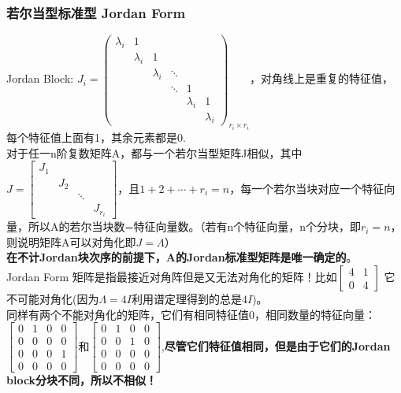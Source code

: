 \documentclass[UTF8]{article}
\begin{document}
    \subsubsection{若尔当型标准型 Jordan Form}
    Jordan Block: $J_{i}=\left(\begin{array}{cccccc}{\lambda_{i}} & {1} & {} & {} & {} \\ {} & {\lambda_{i}} & {1} & {} & {} &{} \\ {} & {} & {\lambda_{i}} & {\ddots} & {}&{} \\ {} & {} & {} & {\ddots} & {1}&{} \\ {} & {} & {} &{} & {\lambda_{i}} & {1} \\ {}&{} & {} & {} & {} & {\lambda_{i}}\end{array}\right)_{r_{i}\times r_{i}}$，对角线上是重复的特征值，每个特征值上面有1，其余元素都是0.
    \\
    对于任一n阶复数矩阵A，都与一个若尔当型矩阵J相似，其中$J=\left[\begin{array}{cccc} J_{1} & & & \\ &J_{2} & & \\ & &  \ddots &\\  & & & J_{r_{i}}
    \end{array}\right]$，且$1+2+\cdots +r_{i}=n$，每一个若尔当块对应一个特征向量，所以A的若尔当块数=特征向量数。（若有n个特征向量，n个分块，即$r_{i}=n$，则说明矩阵A可以对角化即$J=\Lambda$）
    \\
    \textbf{在不计Jordan块次序的前提下，A的Jordan标准型矩阵是唯一确定的}。
    \\
    Jordan Form 矩阵是指最接近对角阵但是又无法对角化的矩阵！比如$\begin{bmatrix}4 & 1 \\ 0 & 4\end{bmatrix}$ 它不可能对角化(因为$\Lambda = 4I$利用谱定理得到的总是$4I$)。\\
    同样有两个不能对角化的矩阵，它们有相同特征值0，相同数量的特征向量：$\left[\begin{array}{lll|l}{0} & {1} & {0} & {0} \\ {0} & {0} & {0} & {0}\\{0}&{0} & {0} & {1} \\ \hline {0}&{0} & {0} & {0}\end{array}\right]$和$\left[\begin{array}{ll|ll}{0} & {1} & {0} & {0} \\ {0} & {0} & {1} & {0} \\ \hline {0}&{0} & {0} & {0} \\{0}&{0} & {0} & {0}\end{array}\right]$,\textbf{尽管它们特征值相同，但是由于它们的Jordan block分块不同，所以不相似！}
\end{document}
